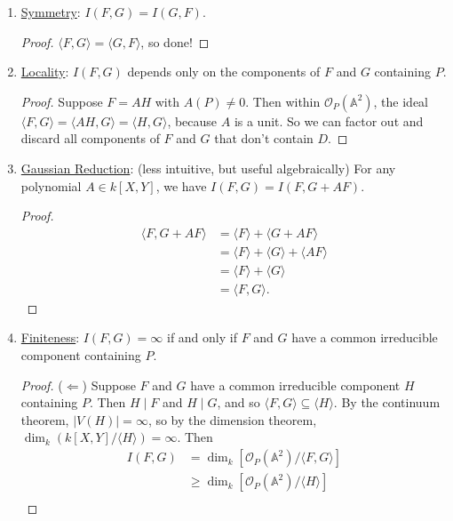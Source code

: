 \documentclass[12pt]{article}
\newcommand{\vbrack}[1]{\langle #1\rangle}
\theoremstyle{definition}
\begin{document}
\begin{enumerate}
\begin{proof}
        Conversely, if $I(F,G)=0$, then $\dim_k[\mathcal{O}_P(\mathbb{A}^2)/\vbrack{F,G}]=0$. Hence $\vbrack{F,G}=\mathcal{O}_P(\mathbb{A}^2)$, so $\vbrack{F,G}$ contains a unit. Say $aF+bG$ is a unit, which means $(aF+bG)(P)\neq0$. So $F(P)\neq0$ or $G(P)\neq0$, and $P\notin F\cap G$.
    \end{proof}
    \item \underline{Symmetry}: $I(F,G)=I(G,F)$.
    \begin{proof}
        $\vbrack{F,G}=\vbrack{G,F}$, so done!
    \end{proof}
    \item \underline{Locality}: $I(F,G)$ depends only on the components of $F$ and $G$ containing $P$.
    \begin{proof}
        Suppose $F=AH$ with $A(P)\neq0$. Then within $\mathcal{O}_P(\mathbb{A}^2)$, the ideal $\vbrack{F,G}=\vbrack{AH,G}=\vbrack{H,G}$, because $A$ is a unit. So we can factor out and discard all components of $F$ and $G$ that don't contain $D$.
    \end{proof}
    \item \underline{Gaussian Reduction}: (less intuitive, but useful algebraically) For any polynomial $A\in k[X,Y]$, we have $I(F,G)=I(F,G+AF)$. 
    \begin{proof}
        \begin{align*}
            \vbrack{F,G+AF}&=\vbrack{F}+\vbrack{G+AF}\\
            &=\vbrack{F}+\vbrack{G}+\vbrack{AF}\\
            &=\vbrack{F}+\vbrack{G}\\
            &=\vbrack{F,G}.
        \end{align*}
    \end{proof}
    \item \underline{Finiteness}: $I(F,G)=\infty$ if and only if $F$ and $G$ have a common irreducible component containing $P$. 
    \begin{proof}
        ($\Leftarrow$) Suppose $F$ and $G$ have a common irreducible component $H$ containing $P$. Then $H\mid F$ and $H\mid G$, and so $\vbrack{F,G}\subseteq\vbrack{H}$. By the continuum theorem, $|V(H)|=\infty$, so by the dimension theorem, $\dim_k(k[X,Y]/\vbrack{H})=\infty$. Then
        \begin{align*}
            I(F,G)&=\dim_k[\mathcal{O}_P(\mathbb{A}^2)/\vbrack{F,G}]\\
            &\geq\dim_k[\mathcal{O}_P(\mathbb{A}^2)/\vbrack{H}]\\

\end{align*}
\end{proof}
\end{enumerate}
\end{document}
